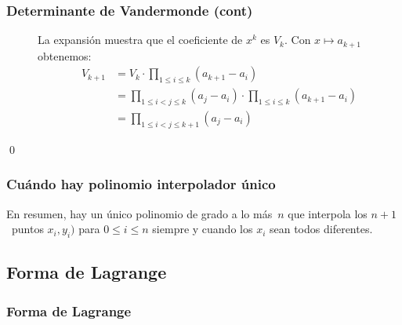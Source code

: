 \documentclass[english, spanish, fleqn,%
hyperref = {colorlinks, urlcolor = blue}%
]{beamer}
\begin{document}
\begin{frame}
  \frametitle{Determinante de Vandermonde (cont)}

  \begin{description}
  \item[]
    La expansión muestra que el coeficiente de \(x^k\) es \(V_k\).
    Con \(x \mapsto a_{k + 1}\) obtenemos:
    \begin{align*}
      V_{k + 1}
        &= V_k \cdot \prod_{1 \le i \le k} (a_{k + 1} - a_i) \\
        &= \prod_{1 \le i < j \le k} (a_j - a_i)
             \cdot \prod_{1 \le i \le k} (a_{k + 1} - a_i) \\
        &= \prod_{1 \le i < j \le k + 1} (a_j - a_i)
    \end{align*}
  \end{description}
  \qed
\end{frame}

\begin{frame}
  \frametitle{Cuándo hay polinomio interpolador único}

  En resumen,
  hay un único polinomio de grado a lo más~\(n\)
  que interpola los \(n + 1\)~puntos
  \(x_i, y_i)\) para \(0 \le i \le n\)
  siempre y cuando los \(x_i\) sean todos diferentes.
\end{frame}

\subsection{Forma de Lagrange}

\begin{frame}
  \frametitle{Forma de Lagrange}

\end{frame}
\end{document}
